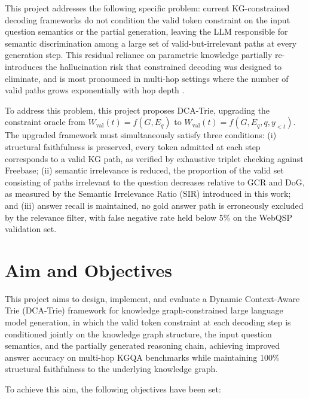 This project addresses the following specific problem: current KG-constrained decoding frameworks do not condition the valid token constraint on the input question semantics or the partial generation, leaving the LLM responsible for semantic discrimination among a large set of valid-but-irrelevant paths at every generation step. This residual reliance on parametric knowledge partially re-introduces the hallucination risk that constrained decoding was designed to eliminate, and is most pronounced in multi-hop settings where the number of valid paths grows exponentially with hop depth \citep{lan2022survey,he2021improving,talmor2018web}.

To address this problem, this project proposes DCA-Trie, upgrading the constraint oracle from $W_{\mathrm{val}}(t) = f(G, E_q)$ to $W_{\mathrm{val}}(t) = f(G, E_q, q, y_{<t})$. The upgraded framework must simultaneously satisfy three conditions: (i) structural faithfulness is preserved, every token admitted at each step corresponds to a valid KG path, as verified by exhaustive triplet checking against Freebase; (ii) semantic irrelevance is reduced, the proportion of the valid set consisting of paths irrelevant to the question decreases relative to GCR and DoG, as measured by the Semantic Irrelevance Ratio (SIR) introduced in this work; and (iii) answer recall is maintained, no gold answer path is erroneously excluded by the relevance filter, with false negative rate held below 5\% on the WebQSP validation set.

\section{Aim and Objectives}

This project aims to design, implement, and evaluate a Dynamic Context-Aware Trie (DCA-Trie) framework for knowledge graph-constrained large language model generation, in which the valid token constraint at each decoding step is conditioned jointly on the knowledge graph structure, the input question semantics, and the partially generated reasoning chain, achieving improved answer accuracy on multi-hop KGQA benchmarks while maintaining 100\% structural faithfulness to the underlying knowledge graph.

To achieve this aim, the following objectives have been set:

